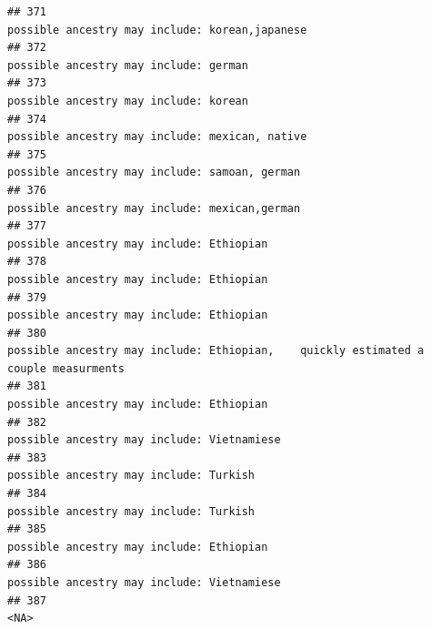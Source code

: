 \documentclass[]{article}
\begin{document}
\begin{verbatim}
## 371                                                                                                      possible ancestry may include: korean,japanese
## 372                                                                                                               possible ancestry may include: german
## 373                                                                                                               possible ancestry may include: korean
## 374                                                                                                      possible ancestry may include: mexican, native
## 375                                                                                                       possible ancestry may include: samoan, german
## 376                                                                                                       possible ancestry may include: mexican,german
## 377                                                                                                            possible ancestry may include: Ethiopian
## 378                                                                                                            possible ancestry may include: Ethiopian
## 379                                                                                                            possible ancestry may include: Ethiopian
## 380                                                                 possible ancestry may include: Ethiopian,    quickly estimated a couple measurments
## 381                                                                                                            possible ancestry may include: Ethiopian
## 382                                                                                                          possible ancestry may include: Vietnamiese
## 383                                                                                                              possible ancestry may include: Turkish
## 384                                                                                                              possible ancestry may include: Turkish
## 385                                                                                                            possible ancestry may include: Ethiopian
## 386                                                                                                          possible ancestry may include: Vietnamiese
## 387                                                                                                                                                <NA>

\end{verbatim}
\end{document}
